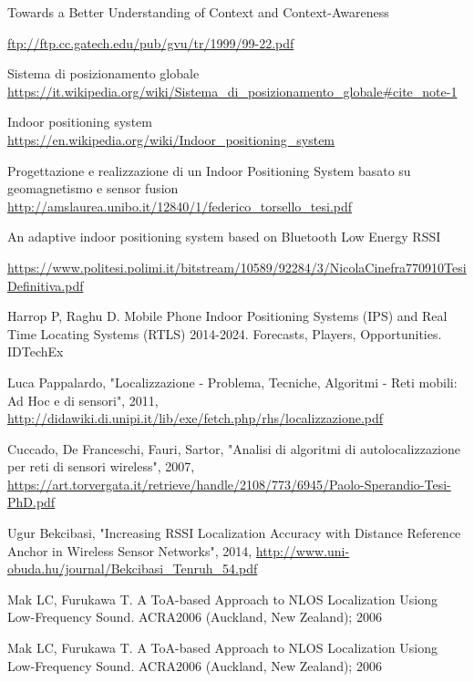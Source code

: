 \begin{thebibliography}{99}

Towards a Better Understanding of Context and Context-Awareness
\author{Anind K. Dey, Gregory D. Abowd}
\url{ftp://ftp.cc.gatech.edu/pub/gvu/tr/1999/99-22.pdf}

Sistema di posizionamento globale
\url{https://it.wikipedia.org/wiki/Sistema_di_posizionamento_globale#cite_note-1}


Indoor positioning system
\url{https://en.wikipedia.org/wiki/Indoor_positioning_system}

Progettazione e realizzazione di un Indoor Positioning System basato su geomagnetismo e sensor fusion
\url{http://amslaurea.unibo.it/12840/1/federico_torsello_tesi.pdf}

An adaptive indoor positioning system based on Bluetooth Low Energy RSSI
\author{Nicola Cinefra}
\url{https://www.politesi.polimi.it/bitstream/10589/92284/3/NicolaCinefra770910TesiDefinitiva.pdf}

Harrop P, Raghu D. Mobile Phone Indoor Positioning Systems (IPS) and Real Time
Locating Systems (RTLS) 2014-2024. Forecasts, Players, Opportunities. IDTechEx

Luca Pappalardo, "Localizzazione - Problema, Tecniche, Algoritmi - Reti mobili:
Ad Hoc e di sensori", 2011,
\url{http://didawiki.di.unipi.it/lib/exe/fetch.php/rhs/localizzazione.pdf}

Cuccado, De Franceschi, Fauri, Sartor, "Analisi di algoritmi di autolocalizzazione
per reti di sensori wireless", 2007,
\url{https://art.torvergata.it/retrieve/handle/2108/773/6945/Paolo-Sperandio-Tesi-PhD.pdf}

Ugur Bekcibasi, "Increasing RSSI Localization Accuracy with Distance Reference
Anchor in Wireless Sensor Networks", 2014,
\url{http://www.uni-obuda.hu/journal/Bekcibasi_Tenruh_54.pdf}

Mak LC, Furukawa T. A ToA-based Approach to NLOS Localization Usiong Low-Frequency Sound. ACRA2006 (Auckland, New Zealand); 2006

Mak LC, Furukawa T. A ToA-based Approach to NLOS Localization Usiong Low-Frequency Sound. ACRA2006 (Auckland, New Zealand); 2006

\end{thebibliography}



